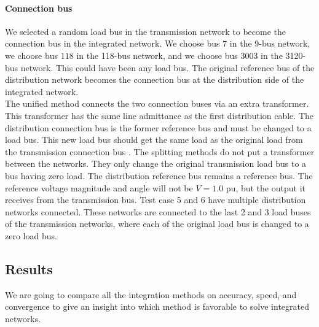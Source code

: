 \documentclass[10pt,journal]{article}
\begin{document}
\paragraph{Connection bus}
We selected a random load bus in the transmission network to become the connection bus in the integrated network. We choose bus $7$ in the 9-bus network, we choose bus $118$ in the 118-bus network, and we choose bus $3003$ in the 3120-bus network. This could have been any load bus. The original reference bus of the distribution network becomes the connection bus at the distribution side of the integrated network. \\
The unified method connects the two connection buses via an extra transformer. This transformer has the same line admittance as the first distribution cable. The distribution connection bus is the former reference bus and must be changed to a load bus. This new load bus should get the same load as the original load from the transmission connection bus \cite{Taranto2008}. The splitting methods do not put a transformer between the networks. They only change the original transmission load bus to a bus having zero load. The distribution reference bus remains a reference bus. The reference voltage magnitude and angle will not be $V=1.0$ pu, but the output it receives from the transmission bus.  \newline \newline
Test case 5 and 6 have multiple distribution networks connected. These networks are connected to the last 2 and 3 load buses of the transmission networks, where each of the original load bus is changed to a zero load bus. 
\subsection{Results}
We are going to compare all the integration methods on accuracy, speed, and convergence to give an insight into which method is favorable to solve integrated networks. 
\end{document}
